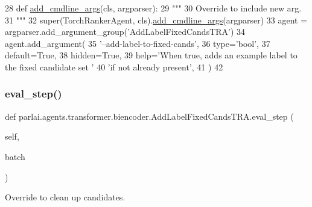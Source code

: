 \begin{DoxyCode}
28     \textcolor{keyword}{def }\hyperlink{namespaceparlai_1_1agents_1_1drqa_1_1config_a62fdd5554f1da6be0cba185271058320}{add\_cmdline\_args}(cls, argparser):
29         \textcolor{stringliteral}{"""}
30 \textcolor{stringliteral}{        Override to include new arg.}
31 \textcolor{stringliteral}{        """}
32         super(TorchRankerAgent, cls).\hyperlink{namespaceparlai_1_1agents_1_1drqa_1_1config_a62fdd5554f1da6be0cba185271058320}{add\_cmdline\_args}(argparser)
33         agent = argparser.add\_argument\_group(\textcolor{stringliteral}{'AddLabelFixedCandsTRA'})
34         agent.add\_argument(
35             \textcolor{stringliteral}{'--add-label-to-fixed-cands'},
36             type=\textcolor{stringliteral}{'bool'},
37             default=\textcolor{keyword}{True},
38             hidden=\textcolor{keyword}{True},
39             help=\textcolor{stringliteral}{'When true, adds an example label to the fixed candidate set '}
40             \textcolor{stringliteral}{'if not already present'},
41         )
42 
\end{DoxyCode}
\mbox{\label{classparlai_1_1agents_1_1transformer_1_1biencoder_1_1AddLabelFixedCandsTRA_ae05059428f346f00e73289120ffb6c1e}} 
\subsubsection{\texorpdfstring{eval\+\_\+step()}{eval\_step()}}
{\footnotesize\ttfamily def parlai.\+agents.\+transformer.\+biencoder.\+Add\+Label\+Fixed\+Cands\+T\+R\+A.\+eval\+\_\+step (\begin{DoxyParamCaption}\item[{}]{self,  }\item[{}]{batch }\end{DoxyParamCaption})}

\begin{DoxyVerb}Override to clean up candidates.
\end{DoxyVerb}
 

